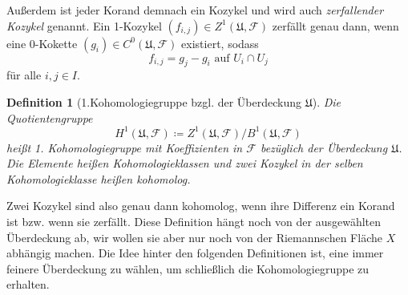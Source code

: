 \documentclass[11pt,a4paper]{scrartcl}
\theoremstyle{thm}
\theoremstyle{def}
\newtheorem{defi}{Definition}[section]
\theoremstyle{remark}
\begin{document}
Außerdem ist jeder Korand demnach ein Kozykel und wird auch \emph{zerfallender Kozykel} genannt.
Ein 1-Kozykel $(f_{i,j})\in Z^1(\mathfrak{U}, \mathcal{F})$ zerfällt genau dann, wenn eine 0-Kokette $ (g_i) \in C^0(\mathfrak{U}, \mathcal{F})$ existiert, sodass 
\[
f_{i,j} = g_j-g_i \text{ auf } U_i\cap U_j
\]
für alle $i,j\in I$.
\begin{defi}[1.Kohomologiegruppe bzgl. der Überdeckung $\mathfrak{U}$]
Die Quotientengruppe 
\[
H^1(\mathfrak{U},\mathcal{F})\coloneqq  {Z^1(\mathfrak{U}, \mathcal{F})}/{B^1(\mathfrak{U}, \mathcal{F})} 
\]
heißt \emph{1. Kohomologiegruppe} mit Koeffizienten in $\mathcal{F}$ bezüglich der Überdeckung $\mathfrak{U}$.
Die Elemente heißen \emph{Kohomologieklassen} und zwei Kozykel in der selben Kohomologieklasse heißen \emph{kohomolog}.
\end{defi}
Zwei Kozykel sind also genau dann kohomolog, wenn ihre Differenz ein Korand ist bzw. wenn sie zerfällt.
Diese Definition hängt noch von der ausgewählten Überdeckung ab, wir wollen sie aber nur noch von der Riemannschen Fläche $X$ abhängig machen. Die Idee hinter den folgenden Definitionen ist, eine immer feinere Überdeckung zu wählen, um schließlich die Kohomologiegruppe zu erhalten.
\end{document}
